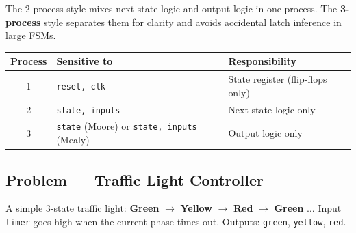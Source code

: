 \documentclass[12pt,a4paper]{article}
\begin{document}
The 2-process style mixes next-state logic and output logic in one process.
The \textbf{3-process} style separates them for clarity and avoids
accidental latch inference in large FSMs.

\begin{center}
\begin{tabular}{clp{7cm}}
  \toprule
  \textbf{Process} & \textbf{Sensitive to} & \textbf{Responsibility} \\
  \midrule
  1 & \texttt{reset, clk}  & State register (flip-flops only) \\
  2 & \texttt{state, inputs} & Next-state logic only \\
  3 & \texttt{state} (Moore) or \texttt{state, inputs} (Mealy)
    & Output logic only \\
  \bottomrule
\end{tabular}
\end{center}

\subsection{Problem --- Traffic Light Controller}

A simple 3-state traffic light: \textbf{Green} $\to$ \textbf{Yellow}
$\to$ \textbf{Red} $\to$ \textbf{Green} $\ldots$
Input \texttt{timer} goes high when the current phase times out.
Outputs: \texttt{green}, \texttt{yellow}, \texttt{red}.
\end{document}
